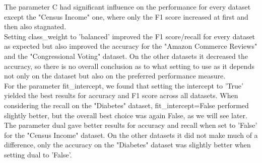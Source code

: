 \documentclass[a4paper,10pt]{article}
\begin{document}
The parameter \textsf{C} had significant influence on the performance for every dataset except the "Census Income" one, where only the F1 score increased at first and then also stagnated.\\
Setting \textsf{class\_weight} to 'balanced' improved the F1 score/recall for every dataset as expected but also improved the accuracy for the "Amazon Commerce Reviews" and the "Congressional Voting" dataset. On the other datasets it decreased the accuracy, so there is no overall conclusion as to what setting to use as it depends not only on the dataset but also on the preferred performance measure.\\
For the parameter \textsf{fit\_intercept}, we found that setting the intercept to 'True' yielded the best results for accuracy and F1 score across all datasets. When considering the recall on the "Diabetes" dataset, \textsf{fit\_intercept}=False performed slightly better, but the overall best choice was again False, as we will see later.\\
The parameter \textsf{dual} gave better results for accuracy and recall when set to 'False' for the "Census Income" dataset. On the other datasets it did not make much of a difference, only the accuracy on the "Diabetes" dataset was slightly better when setting \textsf{dual} to 'False'.
\end{document}

